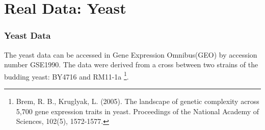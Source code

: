 \section{Real Data: Yeast}
\begin{frame}
    \sectionpage
\end{frame}

\begin{frame}\frametitle{Yeast Data}
    The yeast data can be accessed in Gene Expression Omnibus(GEO) by accession number GSE1990. 
    The data were derived from a cross between two strains of the budding yeast: BY4716 and RM11-1a \footnote[1]{Brem, R. B., Kruglyak, L. (2005). The landscape of genetic complexity across 5,700 gene expression traits in yeast. Proceedings of the National Academy of Sciences, 102(5), 1572-1577.}. 


\end{frame}

%


